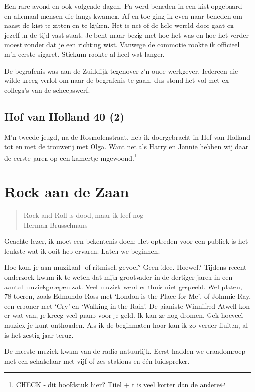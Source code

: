 \documentclass[10pt,twoside,openright]{memoir}
\begin{document}
Een rare avond en ook volgende dagen. Pa werd beneden in een kist opgebaard en allemaal mensen die langs kwamen. Af en toe ging ik even naar beneden om naast de kist te zitten en te kijken. Het is net of de hele wereld door gaat en jezelf in de tijd vast staat. Je bent maar bezig met hoe het was en hoe het verder moest zonder dat je een richting wist. Vanwege de commotie rookte ik officieel m’n eerste sigaret. Stiekum rookte al heel wat langer.

De begrafenis was aan de Zuiddijk tegenover z’n oude werkgever. Iedereen die wilde kreeg verlof om naar de begrafenis te gaan, dus stond het vol met ex-collega’s van de scheepswerf. 

\chapter{Hof van Holland 40 (2)} %
\label{cha:hofvanholland2}

M’n tweede jeugd, na de Rosmolenstraat, heb ik doorgebracht in Hof van Holland tot en met de trouwerij met Olga. Want net als Harry en Jannie hebben wij daar de eerste jaren op een kamertje ingewoond.\footnote{CHECK - dit hoofdstuk hier? Titel + t is veel korter dan de andere}

\part{Rock aan de Zaan}

\begin{quote}
Rock and Roll is dood, maar ik leef nog \\
Herman Brusselmans
\end{quote}

Geachte lezer, ik moet een bekentenis doen: Het optreden voor een publiek is het leukste wat ik ooit heb ervaren. Laten we beginnen.

Hoe kom je aan muzikaal- of ritmisch gevoel? Geen idee. Hoewel? Tijdens recent onderzoek kwam ik te weten dat mijn grootvader in de dertiger jaren in een aantal muziekgroepen zat. Veel muziek werd er thuis niet gespeeld. Wel platen, 78-toeren, zoals Edmundo Ross met `London is the Place for Me', of Johnnie Ray, een crooner met `Cry' en `Walking in the Rain'. De pianiste Winnifred Atwell kon er wat van, je kreeg veel piano voor je geld. Ik kan ze nog dromen. Gek hoeveel muziek je kunt onthouden. Als ik de beginmaten hoor kan ik zo verder fluiten, al is het zestig jaar terug. 

De meeste muziek kwam van de radio natuurlijk. Eerst hadden we draadomroep met een schakelaar met vijf of zes stations en één luidspreker. 
\end{document}
